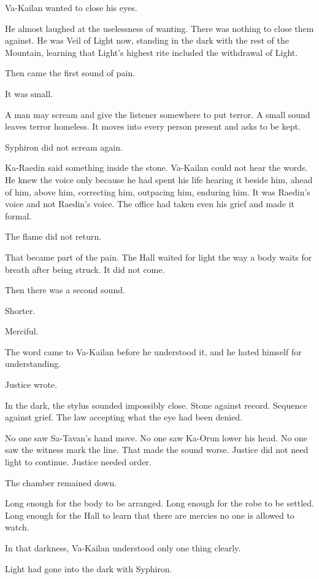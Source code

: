 Va-Kailan wanted to close his eyes.\par
He almost laughed at the uselessness of wanting.
There was nothing to close them against.
He was Veil of Light now, standing in the dark with the rest of the Mountain, learning that Light’s highest rite included the withdrawal of Light.\par
Then came the first sound of pain.\par
It was small.\par
A man may scream and give the listener somewhere to put terror.
A small sound leaves terror homeless.
It moves into every person present and asks to be kept.\par
Syphiron did not scream again.\par
Ka-Raedin said something inside the stone.
Va-Kailan could not hear the words.
He knew the voice only because he had spent his life hearing it beside him, ahead of him, above him, correcting him, outpacing him, enduring him.
It was Raedin’s voice and not Raedin’s voice.
The office had taken even his grief and made it formal.\par
The flame did not return.\par
That became part of the pain.
The Hall waited for light the way a body waits for breath after being struck.
It did not come.\par
Then there was a second sound.\par
Shorter.\par
Merciful.\par
The word came to Va-Kailan before he understood it, and he hated himself for understanding.\par
Justice wrote.\par
In the dark, the stylus sounded impossibly close.
Stone against record.
Sequence against grief.
The law accepting what the eye had been denied.\par
No one saw Sa-Tavan’s hand move.
No one saw Ka-Orun lower his head.
No one saw the witness mark the line.
That made the sound worse.
Justice did not need light to continue.
Justice needed order.\par
The chamber remained down.\par
Long enough for the body to be arranged.
Long enough for the robe to be settled.
Long enough for the Hall to learn that there are mercies no one is allowed to watch.\par
In that darkness, Va-Kailan understood only one thing clearly.\par
Light had gone into the dark with Syphiron.\par
